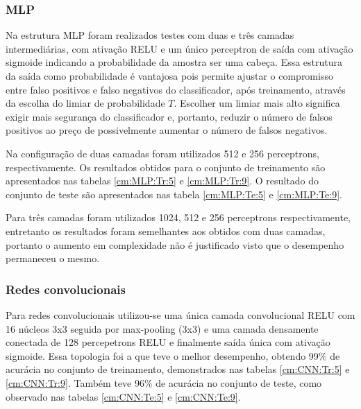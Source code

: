 \subsubsection{MLP}
Na estrutura MLP foram realizados testes com duas e três camadas intermediárias, com ativação RELU e um único perceptron de saída com ativação sigmoide indicando a probabilidade da amostra ser uma cabeça. Essa estrutura da saída como probabilidade é vantajosa pois permite ajustar o compromisso entre falso positivos e falso negativos do classificador, após treinamento, através da escolha do limiar de probabilidade $T$. Escolher um limiar mais alto significa exigir mais segurança do classificador e, portanto, reduzir o número de falsos positivos ao preço de possivelmente aumentar o número de falsos negativos.

Na configuração de duas camadas foram utilizados 512 e 256 perceptrons, respectivamente. Os resultados obtidos para o conjunto de treinamento são apresentados nas tabelas \ref{cm:MLP:Tr:5} e \ref{cm:MLP:Tr:9}. O resultado do conjunto de teste são apresentados nas tabela \ref{cm:MLP:Te:5} e \ref{cm:MLP:Te:9}.

\begin{table}[h!]

\end{table}

Para três camadas foram utilizados 1024, 512 e 256 perceptrons respectivamente, entretanto os resultados foram semelhantes aos obtidos com duas camadas, portanto o aumento em complexidade não é justificado visto que o desempenho permaneceu o mesmo.

\subsubsection{Redes convolucionais}
Para redes convolucionais utilizou-se uma única camada convolucional RELU com 16 núcleos 3x3 seguida por max-pooling (3x3) e uma camada densamente conectada de 128 percepetrons RELU e finalmente saída única com ativação sigmoide. Essa topologia foi a que teve o melhor desempenho, obtendo 99\% de acurácia no conjunto de treinamento, demonstrados nas tabelas \ref{cm:CNN:Tr:5} e \ref{cm:CNN:Tr:9}. Também teve 96\% de acurácia no conjunto de teste, como observado nas tabelas \ref{cm:CNN:Te:5} e \ref{cm:CNN:Te:9}.

